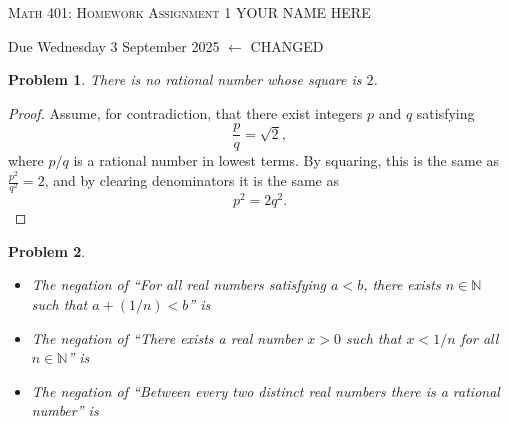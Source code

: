 \documentclass[12pt]{article}
\newtheorem{problem}{Problem}
\newcommand{\NN}{\ensuremath{\mathbb N}}
\begin{document}
\small
\noindent \textsc{Math 401: Homework Assignment 1} \hfill YOUR NAME HERE

\noindent \hfill Due Wednesday 3 September 2025 \hfill $\leftarrow$ CHANGED
\normalsize
\bigskip

\setcounter{problem}{0} %


\begin{problem} %
There is no rational number whose square is $2$. \end{problem}


\begin{proof}
Assume, for contradiction, that there exist integers $p$ and $q$ satisfying
	$$\frac{p}{q} = \sqrt{2},$$
where $p/q$ is a rational number in lowest terms.  By squaring, this is the same as $\frac{p^2}{q^2} = 2$, and by clearing denominators it is the same as
	$$p^2 = 2 q^2.$$
\end{proof}


\begin{problem} %


\begin{itemize}
\item[(a)] The negation of ``For all real numbers satisfying $a<b$, there exists $n\in\NN$ such that $a+(1/n)<b$'' is

\item[(b)] The negation of ``There exists a real number $x>0$ such that $x<1/n$ for all $n\in\NN$'' is

\item[(b)] The negation of ``Between every two distinct real numbers there is a rational number'' is

\end{itemize}
\end{problem}
\end{document}
